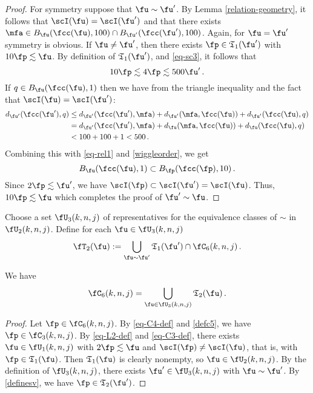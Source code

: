 \begin{proof}
    For symmetry suppose that $\fu \sim \fu'$. By Lemma \eqref{relation-geometry}, it follows that $\scI(\fu) = \scI(\fu')$ and that there exists $\mfa \in B_{\fu}(\fcc(\fu), 100) \cap B_{\fu'}(\fcc(\fu'), 100)$. Again, for $\fu = \fu'$ symmetry is obvious. If $\fu \ne \fu'$, then there exists $\fp \in \mathfrak{T}_1(\fu')$ with $10\fp\lesssim \fu$. By definition of $\mathfrak{T}_1(\fu')$,  and \eqref{eq-sc3}, it follows that
    \begin{equation}
        \label{eq-rel1}
        10\fp \lesssim 4\fp \lesssim 500 \fu'\,.
    \end{equation}
    If $q \in B_{\fu}(\fcc(\fu),1)$ then we have from the triangle inequality and the fact that $\scI(\fu) = \scI(\fu')$:
    \begin{align*}
        d_{\fu'}(\fcc(\fu'), q) &\le d_{\fu'}(\fcc(\fu'), \mfa) + d_{\fu'}(\mfa, \fcc(\fu)) + d_{\fu'}(\fcc(\fu), q)\\
        &= d_{\fu'}(\fcc(\fu'), \mfa) + d_{\fu}(\mfa, \fcc(\fu)) + d_{\fu}(\fcc(\fu), q)\\
        &< 100 + 100 + 1 < 500\,.
    \end{align*}
    Combining this with \eqref{eq-rel1} and \eqref{wiggleorder}, we get
    \begin{equation*}
     B_{\fu}(\fcc(\fu), 1) \subset B_{\fp}(\fcc(\fp), 10)\, .
    \end{equation*}
    Since $2\fp \lesssim \fu'$, we have $\scI(\fp) \subset \scI(\fu') = \scI(\fu)$. Thus, $10\fp \lesssim \fu$ which completes the proof of $\fu' \sim \fu$.
\end{proof}

Choose a set $\fU_3(k,n,j)$ of representatives for the equivalence
classes of $\sim$ in $\fU_2(k,n,j)$.
Define for each $\fu\in \fU_3(k,n,j)$
\begin{equation}\label{definesv}
\fT_2(\fu):=
   \bigcup_{\fu\sim \fu'}\mathfrak{T}_1(\fu')\cap \fC_6(k,n,j)\, .
\end{equation}

\begin{lemma}[C6 forest]
\label{C6-forest}
We have
\begin{equation}
    \fC_6(k,n,j)=\bigcup_{\fu\in \fU_3(k,n,j)}\mathfrak{T}_2(\fu)\, .
\end{equation}
\end{lemma}
\begin{proof}
    Let $\fp \in \fC_6(k,n,j)$.
    By \eqref{eq-C4-def} and \eqref{defc5}, we have $\fp \in \fC_3(k,n,j)$. By \eqref{eq-L2-def} and \eqref{eq-C3-def}, there exists $\fu \in \fU_1(k,n,j)$ with $2\fp \lesssim \fu$ and $\scI(\fp) \ne \scI(\fu)$, that is, with $\fp \in \mathfrak{T}_1(\fu)$. Then $\mathfrak{T}_1(\fu)$ is clearly nonempty, so $\fu \in \fU_2(k,n,j)$. By the definition of $\fU_3(k,n,j)$, there exists $\fu' \in \fU_3(k,n,j)$ with $\fu \sim \fu'$. By \eqref{definesv}, we have $\fp \in \mathfrak{T}_2(\fu')$.
\end{proof}

